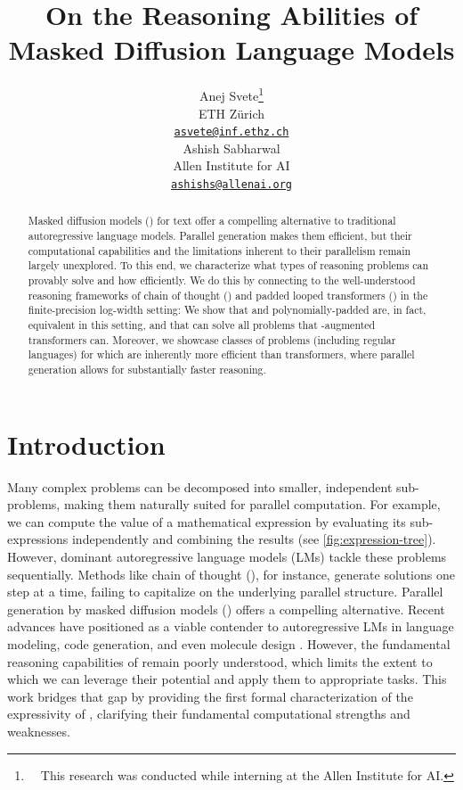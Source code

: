 \documentclass{article} %
\title{On the Reasoning Abilities of Masked Diffusion Language Models}
\author{Anej Svete\thanks{~~This research was conducted while interning at the Allen Institute for AI.} \\
ETH Zürich \\
\href{mailto:asvete@inf.ethz.ch}{\texttt{asvete@inf.ethz.ch}} \\
\And
Ashish Sabharwal \\
Allen Institute for AI \\
\href{mailto:ashishs@allenai.org}{\texttt{ashishs@allenai.org}} \\
}
\begin{document}
\maketitle

\vspace{-5mm}
\begin{abstract}
   Masked diffusion models (\MDMsAcr) for text offer a compelling alternative to traditional autoregressive language models. 
   Parallel generation makes them efficient, but their computational capabilities and the limitations inherent to their parallelism remain largely unexplored. 
   To this end, we characterize what types of reasoning problems \MDMsAcr can provably solve and how efficiently. 
   We do this by connecting \MDMsAcr to the well-understood reasoning frameworks of chain of thought (\CoTAcr) and padded looped transformers (\LTsAcr) in the finite-precision log-width setting: We show that \MDMsAcr and polynomially-padded \LTsAcr are, in fact, equivalent in this setting, and that \MDMsAcr can solve all problems that \CoTAcr-augmented transformers can.
   Moreover, we showcase classes of problems (including regular languages) for which \MDMsAcr are inherently more efficient than \CoTAcr transformers, where parallel generation allows for substantially faster reasoning.
\end{abstract}


\vspace{-4mm}
\section{Introduction} \label{sec:introduction}

Many complex problems can be decomposed into smaller, independent sub-problems, making them naturally suited for parallel computation. 
For example, we can compute the value of a mathematical expression by evaluating its sub-expressions independently and combining the results (see \cref{fig:expression-tree}). 
However, dominant autoregressive language models (LMs) tackle these problems sequentially. 
Methods like chain of thought (\CoTAcr), for instance, generate solutions one step at a time, failing to capitalize on the underlying parallel structure.
Parallel generation by masked diffusion models (\MDMsAcr) offers a compelling alternative.
Recent advances have positioned \MDMsAcr as a viable contender to autoregressive LMs in language modeling, code generation, and even molecule design \citep{Lou2024DiscreteDM,zhang2025surveyparalleltextgeneration,sunSpeedAlwaysWins2025}.
However, the fundamental reasoning capabilities of \MDMsAcr remain poorly understood,
which limits the extent to which we can
leverage their potential and apply them to appropriate tasks.
This work bridges that gap by providing the first formal characterization of the expressivity of \MDMsAcr, clarifying their fundamental computational strengths and weaknesses.
\end{document}
